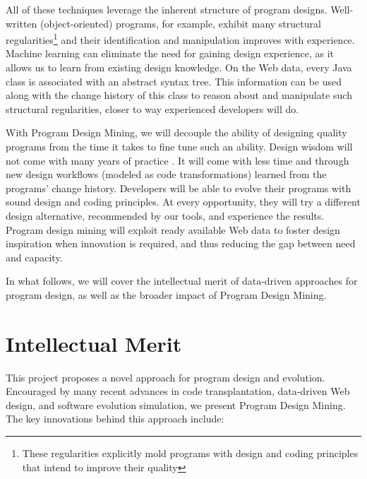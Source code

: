 All of these techniques leverage the inherent structure of program designs. 
Well-written (object-oriented) programs, for example, exhibit many structural 
regularities\footnote{These regularities explicitly mold programs with design 
and coding principles that intend to improve their quality} and their 
identification and manipulation improves with experience. Machine learning 
can eliminate the need for gaining design experience, as it allows us to learn 
from existing design knowledge. On the Web data, every Java class is associated 
with an abstract syntax tree. This information can be used along with the change 
history of this class to reason about and manipulate such structural regularities, 
closer to way experienced developers will do. 

With Program Design Mining, we will decouple the ability of designing quality 
programs from the time it takes to fine tune such an ability. Design wisdom 
will not come with many years of practice \cite{weiser1983programming, 
winslow1996programming}. It will come with less time and through new design 
workflows (modeled as code transformations) learned from the programs' change 
history. Developers will be able to evolve their programs with sound design and 
coding principles. At every opportunity, they will try a different design alternative, 
recommended by our tools, and experience the results. Program design mining will 
exploit ready available Web data to foster design inspiration when innovation is 
required, and thus reducing the gap between need and capacity.

In what follows, we will cover the intellectual merit of data-driven 
approaches for program design, as well as the broader impact of Program 
Design Mining.

\section*{Intellectual Merit} %
\label{sec:merit}

This project proposes a novel approach for program design and 
evolution. Encouraged by many recent advances in code transplantation, 
data-driven Web design, and software evolution simulation, we 
present Program Design Mining. The key innovations behind this 
approach include:

